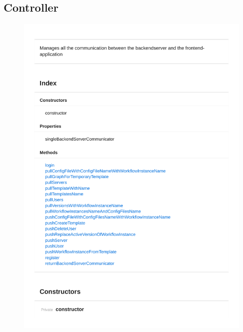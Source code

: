 \subsection{Controller}
\begin{figure}[H]
\centerline{\includegraphics[width=1\textwidth]{FrontendDocsAsPDF/Controller/BackendServerCommunicator.pdf}}
\end{figure}


